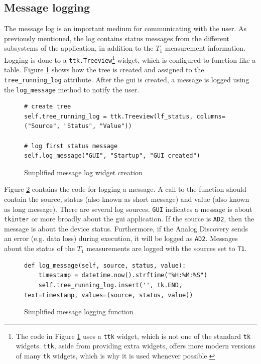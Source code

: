 \subsection{Message logging}
The message log is an important medium for communicating with the user. As previously mentioned, the log contains status messages from the different subsystems of the application, in addition to the $T_1$ measurement information.  Logging is done to a \lstinline|ttk.Treeview|\footnote{The code in Figure \ref{fig:td:treeview} uses a \lstinline|ttk| widget, which is not one of the standard \lstinline|tk| widgets. \lstinline|ttk|, aside from providing extra widgets, offers more modern versions of many \lstinline|tk| widgets, which is why it is used whenever possible.} widget, which is configured to function like a table. Figure \ref{fig:td:treeview} shows how the tree is created and assigned to the \lstinline|tree_running_log| attribute. After the \gls{gui} is created, a message is logged using the \lstinline|log_message| method to notify the user.

\begin{figure}[ht]
	\begin{lstlisting}[language=pythe]
# create tree
self.tree_running_log = ttk.Treeview(lf_status, columns=("Source", "Status", "Value"))

# log first status message
self.log_message("GUI", "Startup", "GUI created")
	\end{lstlisting}
	\caption{Simplified message log widget creation}
	\label{fig:td:treeview}
\end{figure}

Figure \ref{fig:td:log_message_function} contains the code for logging a message. A call to the function should contain the source, status (also known as short message) and value (also known as long message). There are several log sources. \lstinline|GUI| indicates a message is about \lstinline|tkinter| or more broadly about the \gls{gui} application. If the source is \lstinline|AD2|, then the message is about the device status. Furthermore, if the Analog Discovery sends an error (e.g. data loss) during execution, it will be logged as \lstinline|AD2|. Messages about the status of the $T_1$ measurements are logged with the sources set to \lstinline|T1|.

\begin{figure}[ht]
	\begin{lstlisting}[language=pythe]
def log_message(self, source, status, value):
	timestamp = datetime.now().strftime("%H:%M:%S")
	self.tree_running_log.insert('', tk.END, text=timestamp, values=(source, status, value))
	\end{lstlisting}
	\caption{Simplified message logging function}
	\label{fig:td:log_message_function}
\end{figure}


